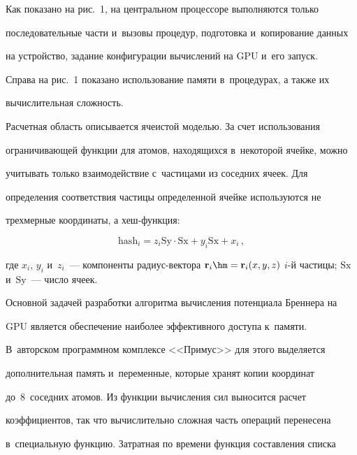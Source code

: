   

  Как показано на рис.~1, на центральном процессоре выполняются только 

последовательные части и~вызовы процедур, подготовка и~копирование данных 

на устройство, задание конфигурации вычислений на GPU и~его запуск. 

  

  Справа на рис.~1 показано использование памяти в~процедурах, а также их 

вычислительная сложность. 

  

  Расчетная область описывается ячеистой моделью. За счет использования 

ограничивающей функции для атомов, находящихся в~некоторой ячейке, можно 

учитывать только взаимодействие с~частицами из соседних ячеек. Для 

определения соответствия частицы определенной ячейке используются не 

трехмерные координаты, а хеш-функ\-ция: 

  \begin{equation*}

  \mathrm{hash}_i=z_i \mathrm{Sy}\cdot \mathrm{Sx} + y_i \mathrm{Sx} +x_i\,,


  \end{equation*}

где $x_i$, $y_i$ и~$z_i$~--- компоненты ра\-ди\-ус-век\-то\-ра $\mathbf{r}_i\hm= 

\mathbf{r}_i(x,y,z)$ $i$-й частицы; $\mathrm{Sx}$ и~$\mathrm{Sy}$~--- число ячеек. 

  

  Основной задачей разработки алгоритма вычисления потенциала Бреннера на 

GPU является обеспечение наиболее эффективного доступа к~памяти. 

В~авторском программном комплексе <<Примус>> для этого выделяется 

дополнительная память и~переменные, которые хранят копии координат 

до~8~соседних атомов. Из функции вычисления сил выносится расчет 

коэффициентов, так что вычислительно сложная часть операций перенесена 

в~специальную функцию. Затратная по времени функция составления списка 

